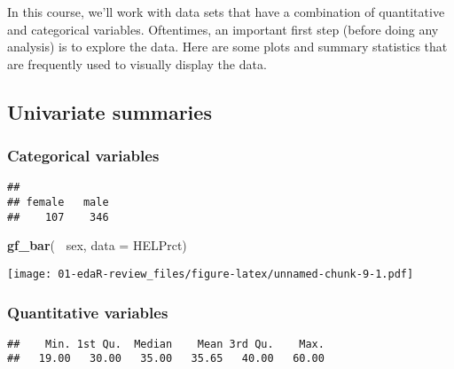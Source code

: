 \documentclass[]{article}
\newenvironment{Shaded}{\begin{snugshade}}{\end{snugshade}}
\newcommand{\KeywordTok}[1]{\textcolor[rgb]{0.13,0.29,0.53}{\textbf{#1}}}
\newcommand{\DataTypeTok}[1]{\textcolor[rgb]{0.13,0.29,0.53}{#1}}
\newcommand{\StringTok}[1]{\textcolor[rgb]{0.31,0.60,0.02}{#1}}
\newcommand{\OperatorTok}[1]{\textcolor[rgb]{0.81,0.36,0.00}{\textbf{#1}}}
\newcommand{\NormalTok}[1]{#1}
\begin{document}
In this course, we'll work with data sets that have a combination of
quantitative and categorical variables. Oftentimes, an important first
step (before doing any analysis) is to explore the data. Here are some
plots and summary statistics that are frequently used to visually
display the data.

\subsection{Univariate summaries}\label{univariate-summaries}

\subsubsection{Categorical variables}\label{categorical-variables}

\begin{Shaded}
\end{Shaded}

\begin{verbatim}
## 
## female   male 
##    107    346
\end{verbatim}

\begin{Shaded}
\begin{Highlighting}[]
\KeywordTok{gf_bar}\NormalTok{(}\OperatorTok{~}\StringTok{ }\NormalTok{sex, }\DataTypeTok{data =}\NormalTok{ HELPrct)}
\end{Highlighting}
\end{Shaded}

\texttt{[image: 01-edaR-review\_files/figure-latex/unnamed-chunk-9-1.pdf]}

\subsubsection{Quantitative variables}\label{quantitative-variables}

\begin{Shaded}
\end{Shaded}

\begin{verbatim}
##    Min. 1st Qu.  Median    Mean 3rd Qu.    Max. 
##   19.00   30.00   35.00   35.65   40.00   60.00
\end{verbatim}
\end{document}
